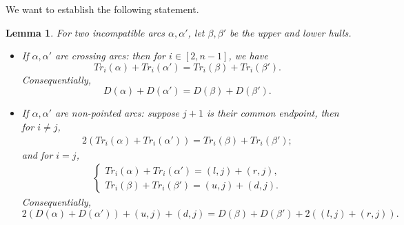 \documentclass{amsart}
\newtheorem{lemma}[theorem]{Lemma}
\theoremstyle{definition}
\newcommand{\pth}[1]{\left( #1 \right)} %
\begin{document}
We want to establish the following statement.

\begin{lemma}
    \label{l:truncation-works}
	For two incompatible arcs $\alpha, \alpha'$, let $\beta, \beta'$ be the upper and lower hulls. 
	\begin{itemize}
		\item If $\alpha, \alpha'$ are crossing arcs: 
		then for $i \in [2, n-1]$, we have 
		\[
		Tr_i (\alpha) + Tr_i (\alpha') =  Tr_i (\beta) + Tr_i (\beta').
		\]
		Consequentially, 
		\[
		D(\alpha) + D(\alpha') = D(\beta)+D(\beta').
		\]
		\item If $\alpha, \alpha'$ are non-pointed arcs: suppose $j+1$ is their common endpoint, then for $i \neq j$,
		\begin{align*}
			2(Tr_i (\alpha) + Tr_i (\alpha')) = Tr_i (\beta) + Tr_i (\beta');
		\end{align*}
		and for $i = j$,
		\begin{align*}
			\begin{cases}
				Tr_i (\alpha) + Tr_i (\alpha') = (l,j) + (r,j),  \\  
				Tr_i (\beta) + Tr_i (\beta') = (u,j) + (d,j).
			\end{cases}%
		\end{align*}
        Consequentially,
        \[
   		2\pth{D(\alpha)+D(\alpha')} + (u,j)+(d,j)= D(\beta)+D(\beta') + 2\pth{(l,j)+(r,j)}.
		\]
	\end{itemize}
\end{lemma}
\end{document}
